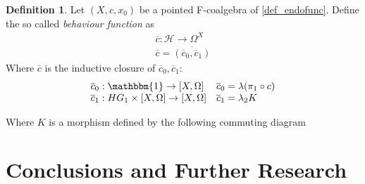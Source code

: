 \documentclass[12pt]{article}
\theoremstyle{definition}
\newtheorem{definition}[theorem]{Definition}
\newcommand{\1}{\mathbbm{1}}
\newcommand{\id}{\text{id}}
\renewcommand{\H}{\mathcal{H}}
\newcommand{\finP}{\mathcal{P}_{\omega}}
\newcommand{\beh}{\overline{c}}
\begin{document}
\begin{definition}
    Let $(X, c, x_0)$ be a pointed F-coalgebra of \ref{def_endofunc}. Define the so called \emph{behaviour function} as
    \begin{align*}
        \beh : \H \to \Omega^X \\
        \beh = \overline{(\beh_0, \beh_1)}
    \end{align*}
    Where $\beh$ is the inductive closure of $\beh_0, \beh_1$:\\
    \[
        \begin{array}{ll}
            \beh_0: \1 \to [X, \Omega] & \beh_0 = \lambda(\pi_1\circ c)\\
            \beh_1: HG_1\times [X, \Omega] \to [X, \Omega] & \beh_1 = \lambda_2 K
        \end{array}
    \]

    Where $K$ is a morphism defined by the following commuting diagram
    \begin{center}
    \end{center}
\end{definition}

\newpage

\section{Conclusions and Further Research}\label{conclusions}





\end{document}
